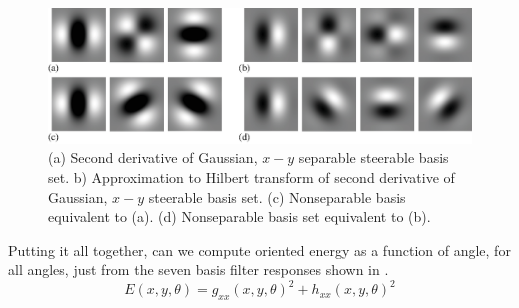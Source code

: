 \begin{figure}[t]
\centerline{
\includegraphics[width=1\linewidth]{figures/spatial_filter_sets/steer_quad_basis.eps}
}
\caption{(a) Second derivative of Gaussian, $x-y$
separable steerable basis set. b) Approximation to Hilbert transform of second derivative of  Gaussian, $x-y$ steerable basis set. (c)  Nonseparable basis equivalent to (a). (d) Nonseparable basis set equivalent to (b).}
\label{fig:steer_quad_basis}
\end{figure}


Putting it all together, can we compute oriented energy
as a function
of angle, for all angles, just from the seven basis filter responses shown in \fig{\ref{fig:steer_quad_basis}}.  
\begin{equation}
E(x,y,\theta) = g_{xx}(x,y,\theta)^2 + h_{xx}(x,y,\theta)^2
\end{equation}

%
%
%
%
%
%
%
%





